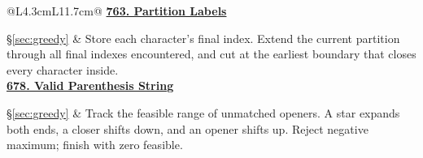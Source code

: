 \documentclass[11pt]{article}
\newcommand{\sect}[1]{\hyperref[sec:#1]{\S\ref*{sec:#1}}}
\begin{document}
\begin{longtable}{@{}L{4.3cm}L{11.7cm}@{}}
\hypertarget{lc763}{}\href{https://leetcode.com/problems/partition-labels/}{\textbf{763. Partition Labels}}\par\sect{greedy} & Store each character's final index. Extend the current partition through all final indexes encountered, and cut at the earliest boundary that closes every character inside.\\[4pt]
\hypertarget{lc678}{}\href{https://leetcode.com/problems/valid-parenthesis-string/}{\textbf{678. Valid Parenthesis String}}\par\sect{greedy} & Track the feasible range of unmatched openers. A star expands both ends, a closer shifts down, and an opener shifts up. Reject negative maximum; finish with zero feasible.\\[4pt]
\bottomrule
\end{longtable}
\end{document}
